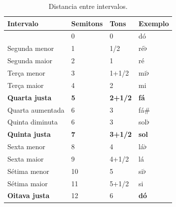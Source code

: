 \begin{table}[h]
  \centering
  \begin{tabular}{|l|l|l|l|}
  \hline
  \textbf{Intervalo} & \textbf{Semitons} & \textbf{Tons} & \textbf{Exemplo}     \\ \hline \hline
  ~                & 0        & 0        & dó \\ \hline
  Segunda menor    & 1        & 1/2      & ré$\flat$ \\ \hline
  Segunda maior    & 2        & 1        & ré        \\ \hline  \hline
  Terça menor      & 3        & 1+1/2    & mi$\flat$ \\ \hline
  Terça maior      & 4        & 2        & mi        \\ \hline  \hline
  \textbf{Quarta justa}     & \textbf{5}        & \textbf{2+1/2}    & \textbf{fá}        \\ \hline
  Quarta aumentada & 6        & 3        & fá$\#$    \\ \hline \hline
  Quinta diminuta  & 6        & 3        & sol$\flat$ \\ \hline 
  \textbf{Quinta justa}     & \textbf{7}        & \textbf{3+1/2}    & \textbf{sol}      \\ \hline \hline
  Sexta menor      & 8        & 4        & lá$\flat$ \\ \hline
  Sexta maior      & 9        & 4+1/2    & lá        \\ \hline \hline
  Sétima menor     & 10       & 5        & si$\flat$ \\ \hline
  Sétima maior     & 11       & 5+1/2    & si        \\ \hline \hline
  \textbf{Oitava justa}     & 12       & 6        & \textbf{dó} \\ \hline
  \end{tabular}
  \caption{Distancia entre intervalos.}
  \label{tab:intervalomelodico2}
\end{table}

